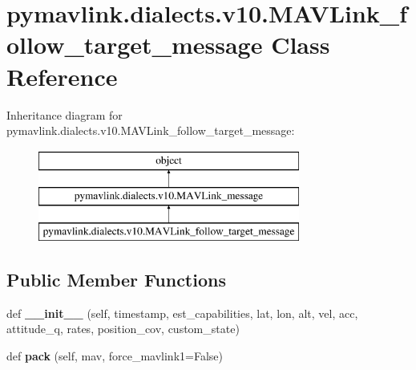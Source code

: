 \hypertarget{classpymavlink_1_1dialects_1_1v10_1_1MAVLink__follow__target__message}{}\section{pymavlink.\+dialects.\+v10.\+M\+A\+V\+Link\+\_\+follow\+\_\+target\+\_\+message Class Reference}
\label{classpymavlink_1_1dialects_1_1v10_1_1MAVLink__follow__target__message}
Inheritance diagram for pymavlink.\+dialects.\+v10.\+M\+A\+V\+Link\+\_\+follow\+\_\+target\+\_\+message\+:\begin{figure}[H]
\begin{center}
\leavevmode
\includegraphics[height=3.000000cm]{classpymavlink_1_1dialects_1_1v10_1_1MAVLink__follow__target__message}
\end{center}
\end{figure}
\subsection*{Public Member Functions}
\begin{DoxyCompactItemize}
\item 
\mbox{\label{classpymavlink_1_1dialects_1_1v10_1_1MAVLink__follow__target__message_a41a0efad967de437b7e2e02ab1e1b893}} 
def {\bfseries \+\_\+\+\_\+init\+\_\+\+\_\+} (self, timestamp, est\+\_\+capabilities, lat, lon, alt, vel, acc, attitude\+\_\+q, rates, position\+\_\+cov, custom\+\_\+state)
\item 
\mbox{\label{classpymavlink_1_1dialects_1_1v10_1_1MAVLink__follow__target__message_af9ba15f0440a7b896a4f71dea35a6dcd}} 
def {\bfseries pack} (self, mav, force\+\_\+mavlink1=False)
\end{DoxyCompactItemize}
